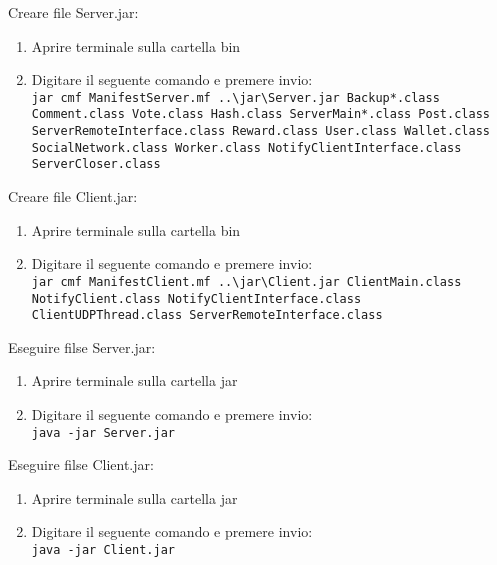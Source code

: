 \documentclass[11pt, a4paper, oneside]{article}
\begin{document}
Creare file Server.jar:
\begin{enumerate}
    \item Aprire terminale sulla cartella bin
    \item Digitare il seguente comando e premere invio:\\
    \texttt{jar cmf ManifestServer.mf ..\textbackslash jar\textbackslash Server.jar Backup*.class Comment.class Vote.class Hash.class ServerMain*.class Post.class ServerRemoteInterface.class 
    Reward.class User.class Wallet.class SocialNetwork.class Worker.class NotifyClientInterface.class ServerCloser.class}
\end{enumerate}
Creare file Client.jar:
\begin{enumerate}
    \item Aprire terminale sulla cartella bin
    \item Digitare il seguente comando e premere invio:\\
    \texttt{jar cmf ManifestClient.mf ..\textbackslash jar\textbackslash Client.jar ClientMain.class NotifyClient.class NotifyClientInterface.class ClientUDPThread.class ServerRemoteInterface.class}
\end{enumerate}
Eseguire filse Server.jar:
\begin{enumerate}
    \item Aprire terminale sulla cartella jar
    \item Digitare il seguente comando e premere invio:\\
    \texttt{java -jar Server.jar}
\end{enumerate}
Eseguire filse Client.jar:
\begin{enumerate}
    \item Aprire terminale sulla cartella jar
    \item Digitare il seguente comando e premere invio:\\
    \texttt{java -jar Client.jar}
\end{enumerate}
\end{document}
